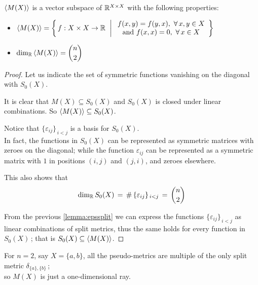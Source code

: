 \documentclass[./main.tex]{subfiles}
\begin{document}
\begin{proposition}
    $\left\langle M(X)\right\rangle$ is a vector subspace of $\mathbb{R}^{X \times X}$ with the following properties:
    \begin{itemize}
        \item $\left\langle M(X)\right\rangle = \bigg\{\, f : {X \times X} \to \mathbb{R}\ \mathrel{\bigg|}
            \begin{array}{c}
                 f(x,y) = f(y,x),\ \forall\, x,y \in X \\
                 \text{and}\ f(x,x) = 0,\ \forall\, x \in X
            \end{array}
         \bigg\}$
         \item $\displaystyle \dim_{\mathbb{R}} \left\langle M(X)\right\rangle = \binom{n}{2}$
    \end{itemize}
\end{proposition}
\begin{proof}
    Let us indicate the set of symmetric functions vanishing on the diagonal with $S_0(X)$.
    
    It is clear that $M(X) \subseteq S_0(X)$ and $S_0(X)$ is closed under linear combinations. So $\left\langle M(X)\right\rangle \subseteq S_0(X)$.
    
    Notice that $\{\varepsilon_{ij}\}_{\, i < j}$ is a basis for $S_0(X)$. \\[2pt]
    In fact, the functions in $S_0(X)$ can be represented as symmetric matrices with zeroes on the diagonal; while the function $\varepsilon_{ij}$ can be represented as a symmetric matrix with $1$ in positions $(i,j)$ and $(j,i)$, and zeroes elsewhere.
    
    This also shows that
    \[ \dim_\R S_0(X) \,=\, \#\,\{\varepsilon_{ij}\}_{\, i < j} \,=\, \binom{n}{2} \nospblw \]

    From the previous \autoref{lemma:epssplit} we can express the functions $\{\varepsilon_{ij}\}_{\, i < j}$ as linear combinations of split metrics, thus the same holds for every function in $S_0(X) \,$; that is $S_0(X) \subseteq \left\langle M(X)\right\rangle$.
\end{proof}

\begin{remark}
    For $n = 2$, say $X = \{a,b\}$, all the pseudo-metrics are multiple of the only split metric $\delta_{\{a\},\{b\}} \,$; \\[5pt]
    so $M(X)$ is just a one-dimensional ray.
\end{remark}
\end{document}
